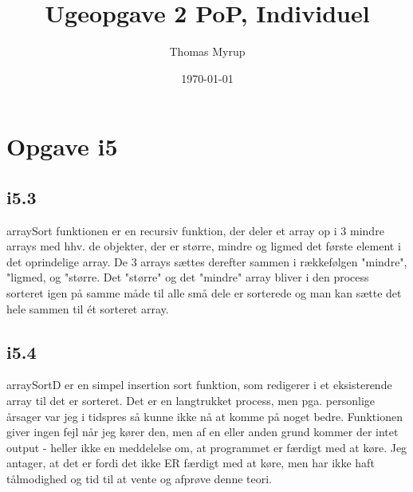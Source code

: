 \documentclass[12pt,a4paper]{report}
\begin{document}
\title{Ugeopgave 2 PoP, Individuel}
\author{Thomas Myrup} 
\date{\today} 
\maketitle
\chapter{Opgave i5}
\section*{i5.3}
arraySort funktionen er en recursiv funktion, der deler et array op i 3 mindre arrays med hhv. de objekter, der er større, mindre og ligmed det første element i det oprindelige array. De 3 arrays sættes derefter sammen i rækkefølgen "mindre", "ligmed, og "større. Det "større" og det "mindre" array bliver i den process sorteret igen på samme måde til alle små dele er sorterede og man kan sætte det hele sammen til ét sorteret array.

\section*{i5.4}
arraySortD er en simpel insertion sort funktion, som redigerer i et eksisterende array til det er sorteret. Det er en langtrukket process, men pga. personlige årsager var jeg i tidspres så kunne ikke nå at komme på noget bedre. Funktionen giver ingen fejl når jeg kører den, men af en eller anden grund kommer der intet output - heller ikke en meddelelse om, at programmet er færdigt med at køre. Jeg antager, at det er fordi det ikke ER færdigt med at køre, men har ikke haft tålmodighed og tid til at vente og afprøve denne teori.
\end{document}
